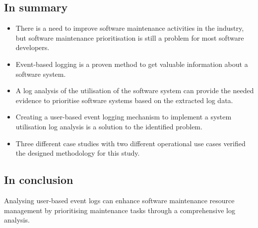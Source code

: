 \subsection{In summary}
\begin{itemize}
	\item There is a need to improve software maintenance activities in the industry, but software
	maintenance prioritisation is still a problem for most software developers.
	\item Event-based logging is a proven method to get valuable information about a software
	system.
	\item A log analysis of the utilisation of the software system can provide the needed evidence
	to prioritise software systems based on the extracted log data.
	\item Creating a user-based event logging mechanism to implement a system utilisation log analysis
	is a solution to the identified problem.
	\item Three different case studies with two different operational use cases verified the
	designed methodology for this study.
\end{itemize}

\subsection{In conclusion}
Analysing user-based event logs can enhance software maintenance resource management by prioritising
maintenance tasks through a comprehensive log analysis.